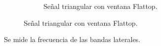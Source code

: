 \begin{figure}[H]
\begin{subfigure}[H]{0.48\textwidth}
          \label{fig:Exp6SeñalFMModulanteTriangularRectangular}
        \end{subfigure}
       \begin{subfigure}[H]{0.48\textwidth}
          \caption{Señal triangular con ventana Flattop.}
          \label{fig:Exp6SeñalFMModulanteTriangularFlattop}
        \end{subfigure}
      \end{figure}         

    Se mide la frecuencia de las bandas laterales.

